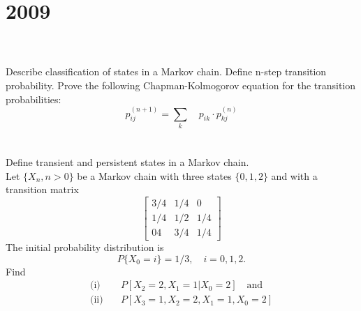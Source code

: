 \section*{2009}
\vspace{-.5cm}
\hrulefill\\\\
 Describe classification of states in a Markov chain. Define n-step transition probability. Prove the following Chapman-Kolmogorov equation for the transition probabilities:
\begin{equation*}
    p_{ij}^{(n+1)} = \sum_{k} \quad p_{ik} \cdot p_{kj}^{(n)}
\end{equation*}
\\\\
 Define transient and persistent states in a Markov chain.\\
Let $\{X_n, n>0\}$ be a Markov chain with three states $\{0,1,2\}$ and with a transition matrix
\begin{equation*}
    \begin{bmatrix}
    3/4 & 1/4 & 0\\
    1/4 & 1/2 & 1/4 \\
    0 4 & 3/4 & 1/4
    \end{bmatrix}
\end{equation*}
The initial probability distribution is 
\[ P\{X_0 = i\} = 1/3, \quad i=0,1,2. \]
Find \[ \begin{align*}
    \text{(i)} \quad & P[X_2 =2, X_1 = 1 | X_0 =2] \quad \text{and}\\
    \text{(ii)} \quad & P[X_3 =1, X_2 = 2, X_1 =1, X_0 =2]
\end{align*} \]
\medbreak